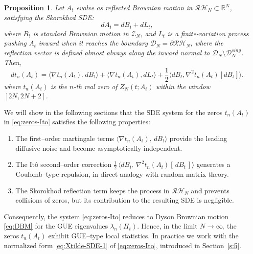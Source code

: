 \documentclass[12pt,reqno]{amsart}
\theoremstyle{plain}
\newtheorem{prop}{Proposition}[section]
\theoremstyle{definition}
\theoremstyle{remark}
\begin{document}
\begin{prop}
Let $A_t$ evolve as reflected Brownian motion in $\mathcal{RH}_N \subset \mathbb{R}^N$, satisfying the Skorokhod SDE:
\begin{equation}
dA_t = dB_t + dL_t, 
\end{equation}
where $B_t$ is standard Brownian motion in $\mathcal{Z}_N$, and $L_t$ is a finite-variation process pushing $A_t$ inward when it reaches the boundary $\mathcal{D}_N = \partial \mathcal{RH}_N$, where the reflection vector is defined almost always along the inward normal to $\mathcal{D}_N \setminus \mathcal{D}_N^{sing}$. Then, 
\begin{equation}
\label{eq:zeros-Ito}
d t_n(A_t) = \langle \nabla t_n(A_t), dB_t \rangle + \langle \nabla t_n(A_t), dL_t \rangle + \frac{1}{2} \langle dB_t, \nabla^2 t_n(A_t)[dB_t] \rangle. 
\end{equation}
where $t_n(A_t)$ is the $n$-th real zero of $Z_N(t; A_t)$ within the window $[2N,2N+2]$. 
\end{prop}
We will show in the following sections that the SDE system for the zeros \(t_n(A_t)\) in \eqref{eq:zeros-Ito} satisfies the following properties:
\begin{enumerate}
\item The first–order martingale terms \(\langle \nabla t_n(A_t),\, dB_t\rangle\) provide the leading diffusive noise and become asymptotically independent.
\item The Itô second–order correction \(\tfrac{1}{2}\,\langle dB_t,\,\nabla^{2} t_n(A_t)[\,dB_t\,]\rangle\) generates a Coulomb–type repulsion, in direct analogy with random matrix theory.
\item The Skorokhod reflection term keeps the process in \(\mathcal{RH}_N\) and prevents collisions of zeros, but its contribution to the resulting SDE is negligible.
\end{enumerate}

Consequently, the system \eqref{eq:zeros-Ito} reduces to Dyson Brownian motion \eqref{eq:DBM} for the GUE eigenvalues \(\lambda_n(H_t)\). Hence, in the limit \(N\to\infty\), the zeros \(t_n(A_t)\) exhibit GUE–type local statistics. In practice we work with the normalized form \eqref{eq:Xtilde-SDE-1} of \eqref{eq:zeros-Ito}, introduced in Section~\ref{s:5}.
\end{document}
